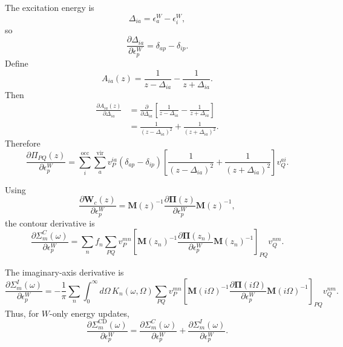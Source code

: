 The excitation energy is
\begin{equation}
    \Delta_{ia}
    =
    \epsilon_a^W-\epsilon_i^W,
\end{equation}
so
\begin{equation}
    \frac{\partial \Delta_{ia}}
    {\partial \epsilon_p^W}
    =
    \delta_{ap}-\delta_{ip}.
\end{equation}
Define
\begin{equation}
    A_{ia}(z)
    =
    \frac{1}{z-\Delta_{ia}}
    -
    \frac{1}{z+\Delta_{ia}}.
\end{equation}
Then
\begin{align}
    \frac{\partial A_{ia}(z)}
    {\partial \Delta_{ia}}
    &=
    \frac{\partial}{\partial \Delta_{ia}}
    \left[
    \frac{1}{z-\Delta_{ia}}
    -
    \frac{1}{z+\Delta_{ia}}
    \right] \\
    &=
    \frac{1}{(z-\Delta_{ia})^2}
    +
    \frac{1}{(z+\Delta_{ia})^2}.
\end{align}
Therefore
\begin{equation}
    \boxed{
    \frac{\partial \Pi_{PQ}(z)}
    {\partial \epsilon_p^W}
    =
    \sum_i^{\mathrm{occ}}
    \sum_a^{\mathrm{vir}}
    v_P^{ia}
    \left(\delta_{ap}-\delta_{ip}\right)
    \left[
    \frac{1}{(z-\Delta_{ia})^2}
    +
    \frac{1}{(z+\Delta_{ia})^2}
    \right]
    v_Q^{ai}
    }.
\end{equation}

Using
\begin{equation}
    \frac{\partial \mathbf W_c(z)}
    {\partial \epsilon_p^W}
    =
    \mathbf M(z)^{-1}
    \frac{\partial \boldsymbol{\Pi}(z)}
    {\partial \epsilon_p^W}
    \mathbf M(z)^{-1},
\end{equation}
the contour derivative is
\begin{equation}
    \boxed{
    \frac{\partial \Sigma_m^C(\omega)}
    {\partial \epsilon_p^W}
    =
    \sum_n f_n
    \sum_{PQ}
    v_P^{mn}
    \left[
    \mathbf M(z_n)^{-1}
    \frac{\partial \boldsymbol{\Pi}(z_n)}
    {\partial \epsilon_p^W}
    \mathbf M(z_n)^{-1}
    \right]_{PQ}
    v_Q^{nm}
    }.
\end{equation}

The imaginary-axis derivative is
\begin{equation}
    \boxed{
    \frac{\partial \Sigma_m^I(\omega)}
    {\partial \epsilon_p^W}
    =
    -\frac{1}{\pi}
    \sum_n
    \int_0^\infty d\Omega\,
    K_n(\omega,\Omega)
    \sum_{PQ}
    v_P^{mn}
    \left[
    \mathbf M(i\Omega)^{-1}
    \frac{\partial \boldsymbol{\Pi}(i\Omega)}
    {\partial \epsilon_p^W}
    \mathbf M(i\Omega)^{-1}
    \right]_{PQ}
    v_Q^{nm}
    }.
\end{equation}
Thus, for \(W\)-only energy updates,
\begin{equation}
    \boxed{
    \frac{\partial \Sigma_m^{\mathrm{CD}}(\omega)}
    {\partial \epsilon_p^W}
    =
    \frac{\partial \Sigma_m^C(\omega)}
    {\partial \epsilon_p^W}
    +
    \frac{\partial \Sigma_m^I(\omega)}
    {\partial \epsilon_p^W}
    }.
\end{equation}

